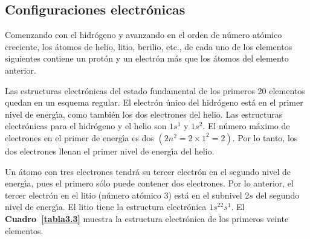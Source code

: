 \subsection{Configuraciones electr\'onicas}
Comenzando con el hidr\'ogeno y avanzando en el orden de n\'umero at\'o\-mi\-co
creciente, los \'atomos de helio, litio, berilio, etc., de cada uno de los elementos siguientes contiene un prot\'on y un electr\'on m\'as que los \'atomos
del elemento anterior.

Las estructuras electr\'onicas  del  estado fundamental de los primeros 20 elementos quedan en un esquema regular. El
electr\'on \'unico del hidr\'ogeno est\'a en el primer nivel de energ\'{\i}a, como tambi\'en los dos electrones del helio. Las estructuras electr\'onicas para el
hidr\'ogeno y el helio son $1s^1$ y $1s^2$. El n\'umero m\'aximo de electrones en el primer de energ\'{\i}a es dos $(2n^2 = 2 \times 1^2 = 2)$. Por lo tanto, los dos
electrones llenan el primer nivel de energ\'{\i}a del helio.

Un \'atomo con tres electrones tendr\'a su tercer electr\'on en el segundo nivel de energ\'{\i}a, pues el primero s\'olo puede contener dos electrones. Por lo
anterior, el tercer electr\'on en el litio (n\'umero at\'omico 3) est\'a en el subnivel $2s$ del segundo nivel de energ\'{\i}a. El litio tiene la estructura
electr\'onica $1s^22s^1$. El \textbf{Cuadro~\ref{tabla3.3}} muestra la estructura electr\'onica de los primeros veinte elementos.

